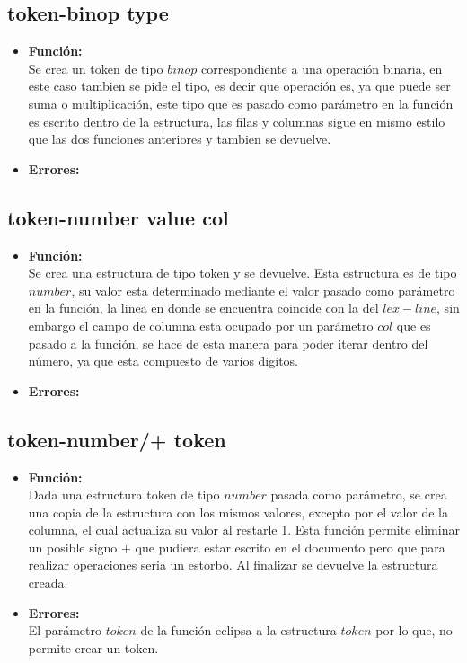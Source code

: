 \documentclass{article}
\begin{document}
\subsection{token-binop type}
\begin{itemize}
    \item \textbf{Función:} \\
    Se crea un token de tipo $binop$ correspondiente a una operación binaria, en este caso tambien se pide el tipo, es decir que operación es, ya que puede ser suma o multiplicación, este tipo que es pasado como parámetro en la función es escrito dentro de la estructura, las filas y columnas sigue en mismo estilo que las dos funciones anteriores y tambien se devuelve.
    \item \textbf{Errores:} \\ 
\end{itemize}
\subsection{token-number value col}
\begin{itemize}
    \item \textbf{Función:} \\
    Se crea una estructura de tipo token y se devuelve. Esta estructura es de tipo $number$, su valor esta determinado mediante el valor pasado como parámetro en la función, la linea en donde se encuentra coincide con la del $lex-line$, sin embargo el campo de columna esta ocupado por un parámetro $col$ que es pasado a la función, se hace de esta manera para poder iterar dentro del número, ya que esta compuesto de varios digitos.
    \item \textbf{Errores:} \\
\end{itemize}
\subsection{token-number/+ token}
\begin{itemize}
    \item \textbf{Función:} \\
    Dada una estructura token de tipo $number$ pasada como parámetro, se crea una copia de la estructura con los mismos valores, excepto por el valor de la columna, el cual actualiza su valor al restarle 1. Esta función permite eliminar un posible signo + que pudiera estar escrito en el documento pero que para realizar operaciones seria un estorbo. Al finalizar se devuelve la estructura creada.
    \item \textbf{Errores:} \\ 
    El parámetro $token$ de la función eclipsa a la estructura $token$ por lo que, no permite crear un token.
\end{itemize}
\end{document}

